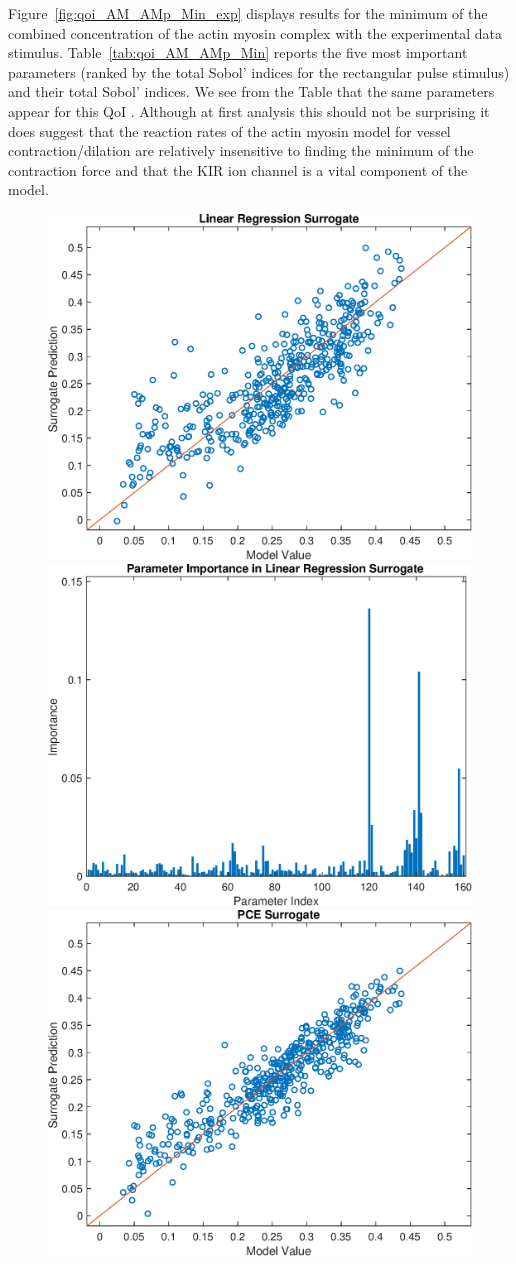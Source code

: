 Figure~\ref{fig:qoi_AM_AMp_Min_exp} displays results for the minimum of the combined concentration of the actin myosin complex with the experimental data stimulus. Table~\ref{tab:qoi_AM_AMp_Min} reports the five most important parameters (ranked by the total Sobol' indices for the rectangular pulse stimulus) and their total Sobol' indices. We see from the Table that the same parameters appear for this QoI . Although at first analysis this should not be surprising it does suggest that the reaction rates of the actin myosin model for vessel contraction/dilation are relatively insensitive to finding the minimum of the contraction force and that the KIR ion channel is a vital component of the model. 
\begin{figure}[h]
\centering
\includegraphics[width=.49 \textwidth]{Figures/AM_AMp_Min_QoI_LR_Prediction_Experimental.eps}
\includegraphics[width=.49 \textwidth]{Figures/AM_AMp_Min_QoI_LR_VI_Experimental.eps} \\
\includegraphics[width=.49 \textwidth]{Figures/AM_AMp_Min_QoI_PCE_Prediction_Experimental.eps}

\end{figure}
